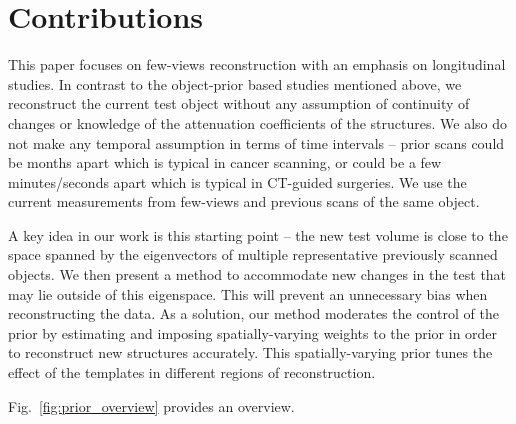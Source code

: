\documentclass[journal]{IEEEtran}
\begin{document}
\section{Contributions}
\label{sec:contributions}
This paper focuses on few-views reconstruction with an emphasis on
longitudinal studies. In contrast to the object-prior based studies
mentioned above, we reconstruct the current test object without any
assumption of continuity of changes or knowledge of the attenuation
coefficients of the structures. We also do not make any temporal
assumption in terms of time intervals -- prior scans could be months
apart which is typical in cancer scanning, or could be a few
minutes/seconds apart which is typical in CT-guided surgeries. We use
the current measurements from few-views and previous scans of the same
object.

A key idea in our work is this starting
point -- the new test volume is close to the space spanned by the
eigenvectors of multiple representative previously scanned objects.
We then present a method to accommodate new changes in the test that
may lie outside of this eigenspace. This will prevent an unnecessary
bias when reconstructing the data. As a solution, our method moderates
the control of the prior by estimating and imposing spatially-varying
weights to the prior in order to reconstruct new structures
accurately. This spatially-varying prior tunes the effect of the
templates in different regions of reconstruction.

Fig.~\ref{fig:prior_overview} provides an overview.

\end{document}
